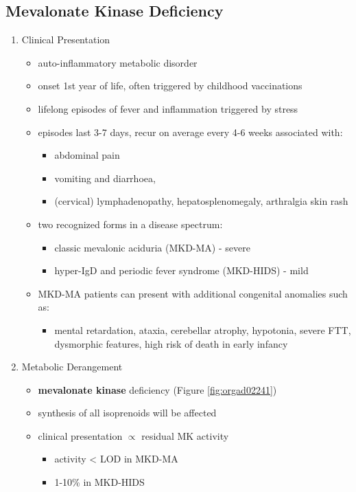 \documentclass{scrartcl}
\begin{document}
\subsection{Mevalonate Kinase Deficiency}
\label{sec:org75009a1}
\begin{enumerate}
\item Clinical Presentation
\label{sec:org545cdf9}
\begin{itemize}
\item auto-inflammatory metabolic disorder
\item onset 1st year of life, often triggered by childhood vaccinations
\item lifelong episodes of fever and inflammation triggered by stress
\item episodes last 3-7 days, recur on average every 4-6 weeks associated with:
\begin{itemize}
\item abdominal pain
\item vomiting and diarrhoea,
\item (cervical) lymphadenopathy, hepatosplenomegaly, arthralgia skin rash
\end{itemize}
\item two recognized forms in a disease spectrum:
\begin{itemize}
\item classic mevalonic aciduria (MKD-MA) - severe
\item hyper-IgD and periodic fever syndrome (MKD-HIDS) - mild
\end{itemize}

\item MKD-MA patients can present with additional congenital anomalies
such as:
\begin{itemize}
\item mental retardation, ataxia, cerebellar atrophy, hypotonia, severe
FTT, dysmorphic features, high risk of death in early infancy
\end{itemize}
\end{itemize}

\item Metabolic Derangement
\label{sec:org0c3af69}
\begin{itemize}
\item \textbf{mevalonate kinase} deficiency (Figure \ref{fig:orgad02241})
\end{itemize}
\begin{itemize}
\item synthesis of all isoprenoids will be affected
\item clinical presentation \(\propto\) residual MK activity
\begin{itemize}
\item activity < LOD in MKD-MA
\item 1-10\% in MKD-HIDS
\end{itemize}
\end{itemize}


\end{enumerate}
\end{document}
